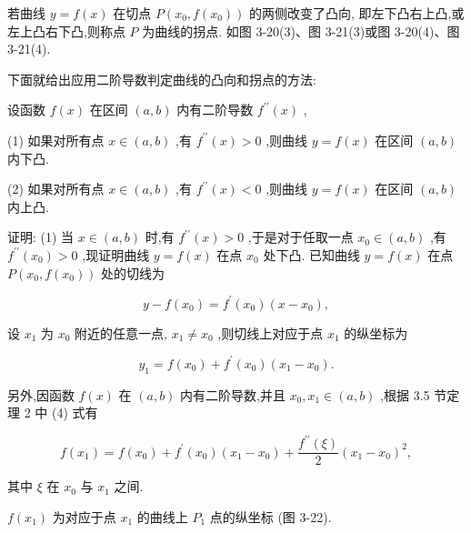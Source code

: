 \documentclass[lang=cn,newtx,12pt,scheme=chinese]{elegantbook}
\begin{document}
若曲线 \(y = f\left( x\right)\) 在切点 \(P\left( {{x}_{0},f\left( {x}_{0}\right) }\right)\) 的两侧改变了凸向, 即左下凸右上凸,或左上凸右下凸,则称点 \(P\) 为曲线的拐点. 如图 3-20(3)、图 3-21(3)或图 3-20(4)、图 3-21(4).

下面就给出应用二阶导数判定曲线的凸向和拐点的方法:

\begin{theorem}[定理]

设函数 \(f\left( x\right)\) 在区间 \(\left( {a,b}\right)\) 内有二阶导数 \({f}^{\prime \prime }\left( x\right)\) ,

(1) 如果对所有点 \(x \in \left( {a,b}\right)\) ,有 \({f}^{\prime \prime }\left( x\right) > 0\) ,则曲线 \(y = f\left( x\right)\) 在区间 \(\left( {a,b}\right)\) 内下凸.

(2) 如果对所有点 \(x \in \left( {a,b}\right)\) ,有 \({f}^{\prime \prime }\left( x\right) < 0\) ,则曲线 \(y = f\left( x\right)\) 在区间 \(\left( {a,b}\right)\) 内上凸.

\end{theorem}

证明: (1) 当 \(x \in \left( {a,b}\right)\) 时,有 \({f}^{\prime \prime }\left( x\right) > 0\) ,于是对于任取一点 \({x}_{0} \in \left( {a,b}\right)\) ,有 \({f}^{\prime \prime }\left( {x}_{0}\right) > 0\) ,现证明曲线 \(y = f\left( x\right)\) 在点 \({x}_{0}\) 处下凸. 已知曲线 \(y = f\left( x\right)\) 在点 \(P\left( {{x}_{0},f\left( {x}_{0}\right) }\right)\) 处的切线为

\[
y - f\left( {x}_{0}\right) = {f}^{\prime }\left( {x}_{0}\right) \left( {x - {x}_{0}}\right) ,
\]

设 \({x}_{1}\) 为 \({x}_{0}\) 附近的任意一点, \({x}_{1} \neq {x}_{0}\) ,则切线上对应于点 \({x}_{1}\) 的纵坐标为

\[
{y}_{1} = f\left( {x}_{0}\right) + {f}^{\prime }\left( {x}_{0}\right) \left( {{x}_{1} - {x}_{0}}\right) . \tag{1}
\]

另外,因函数 \(f\left( x\right)\) 在 \(\left( {a,b}\right)\) 内有二阶导数,并且 \({x}_{0},{x}_{1} \in \left( {a,b}\right)\) ,根据 3.5 节定理 2 中 (4) 式有

\[
f\left( {x}_{1}\right) = f\left( {x}_{0}\right) + {f}^{\prime }\left( {x}_{0}\right) \left( {{x}_{1} - {x}_{0}}\right) + \frac{{f}^{\prime \prime }\left( \xi \right) }{2}{\left( {x}_{1} - {x}_{0}\right) }^{2}, \tag{2}
\]

其中 \(\xi\) 在 \({x}_{0}\) 与 \({x}_{1}\) 之间.

\(f\left( {x}_{1}\right)\) 为对应于点 \({x}_{1}\) 的曲线上 \({P}_{1}\) 点的纵坐标 (图 3-22).
\end{document}
